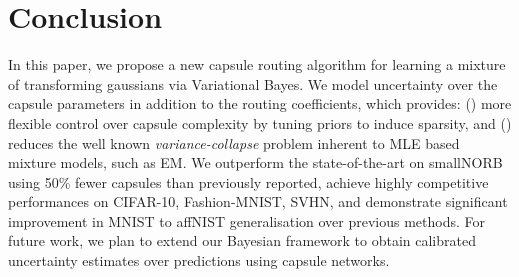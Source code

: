 \documentclass[letterpaper]{article} \usepackage{aaai20}  \usepackage{times}  \usepackage{helvet} \usepackage{courier}  \usepackage[hyphens]{url}  \usepackage{graphicx} \urlstyle{rm} \def\UrlFont{\rm}  \usepackage{graphicx}  \frenchspacing  \setlength{\pdfpagewidth}{8.5in}  \setlength{\pdfpageheight}{11in}  \nocopyright
\newcommand{\lowerromannumeral}[1]{\romannumeral#1\relax}
\begin{document}
\section{Conclusion}
In this paper, we propose a new capsule routing algorithm for learning a mixture of transforming gaussians via Variational Bayes. We model uncertainty over the capsule parameters in addition to the routing coefficients, which provides: (\lowerromannumeral{1}) more flexible control over capsule complexity by tuning priors to induce sparsity, and (\lowerromannumeral{2}) reduces the well known \textit{variance-collapse} problem inherent to MLE based mixture models, such as EM. We outperform the state-of-the-art on smallNORB using 50\% fewer capsules than previously reported, achieve highly competitive performances on CIFAR-10, Fashion-MNIST, SVHN, and demonstrate significant improvement in MNIST to affNIST generalisation over previous methods. For future work, we plan to extend our Bayesian framework to obtain calibrated uncertainty estimates over predictions using capsule networks.
{\fontsize{9.0pt}{10.0pt}\selectfont
}

\end{document}
